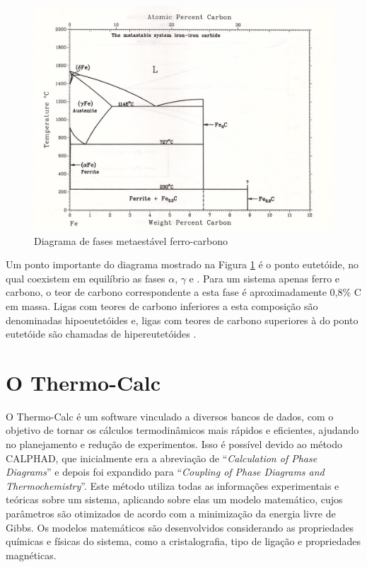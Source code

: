\documentclass[brazil,tf,epusp]{usp}  %
\begin{document}
\begin{figure}[ht!]
  \includegraphics[width=.8\textwidth,angle=180]{img/Fe-C_meta.jpg}
  \caption{Diagrama de fases metaestável ferro-carbono \cite{Massalski1996v1}}
  \label{fig:diagrama_fe-c_meta}
\end{figure}

Um ponto importante do diagrama mostrado na Figura \ref{fig:diagrama_fe-c_meta} é o ponto eutetóide, no qual coexistem em equilíbrio as fases $\alpha$, $\gamma$ e . Para um sistema apenas ferro e carbono, o teor de carbono correspondente a esta fase é aproximadamente 0,8\% C em massa. Ligas com teores de carbono inferiores a esta composição são denominadas hipoeutetóides e, ligas com teores de carbono superiores à do ponto eutetóide são chamadas de hipereutetóides \cite{Honeycombe1982}.

\section{O Thermo-Calc\textregistered{}}

O Thermo-Calc\textregistered{} é um software vinculado a diversos bancos de dados, com o objetivo de tornar os cálculos termodinâmicos mais rápidos e eficientes, ajudando no planejamento e redução de experimentos. Isso é possível devido ao método CALPHAD, que inicialmente era a abreviação de ``\textit{Calculation of Phase Diagrams}'' e depois foi expandido para ``\textit{Coupling of Phase Diagrams and Thermochemistry}''. Este método utiliza todas as informações experimentais e teóricas sobre um sistema, aplicando sobre elas um modelo matemático, cujos parâmetros são otimizados de acordo com a minimização da energia livre de Gibbs. Os modelos matemáticos são desenvolvidos considerando as propriedades químicas e físicas do sistema, como a cristalografia, tipo de ligação e propriedades magnéticas.
\end{document}
